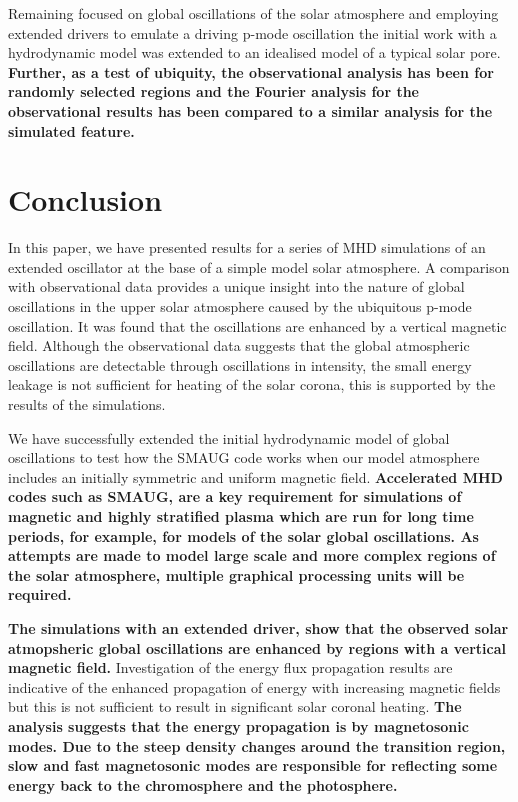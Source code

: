 \documentclass[physics,article,submit,pdftex,moreauthors]{Definitions/mdpi}
\begin{document}
 



Remaining focused on global oscillations of the solar atmosphere and employing extended drivers to emulate a driving p-mode oscillation the initial work with a hydrodynamic model was extended to an idealised model of a typical solar pore. {\bf Further, as a test of ubiquity, the observational analysis has been for randomly selected regions and the Fourier analysis for the observational results has been compared to a similar analysis for the simulated feature.}  








\section{Conclusion}

In this paper, we have presented results for a series of MHD simulations of an extended oscillator at the base of a simple model solar atmosphere. A comparison with observational data provides a unique insight into the nature of  global oscillations in the upper solar atmosphere caused by the ubiquitous p-mode oscillation. It was found that the oscillations are enhanced by a vertical magnetic field. Although the observational data suggests that the global atmospheric oscillations are detectable through oscillations in intensity, the small energy leakage is not sufficient for heating of the solar corona, this is supported by the results of the simulations.

We  have successfully extended the initial hydrodynamic model of global oscillations to test how the SMAUG \cite{Griffiths2015} code works when our model atmosphere includes an initially symmetric and uniform magnetic field. {\bf Accelerated MHD codes such as SMAUG, are a key requirement for simulations of magnetic and highly stratified plasma which are run for long time periods, for example, for models of the solar global oscillations. As attempts are made to model large scale and more complex regions of the solar atmosphere, multiple graphical processing units will be required.}

{\bf The simulations with an extended driver, show that the observed  solar atmopsheric global oscillations are enhanced by regions with a vertical magnetic field. } Investigation of the energy flux propagation results are indicative of the enhanced propagation of energy with increasing magnetic fields but this is not sufficient to result in significant solar coronal heating. {\bf The analysis suggests that the energy propagation is by magnetosonic modes. Due to the steep density changes around the transition region, slow and fast magnetosonic modes are responsible for reflecting some energy back to the chromosphere and the photosphere. }  
\end{document}
